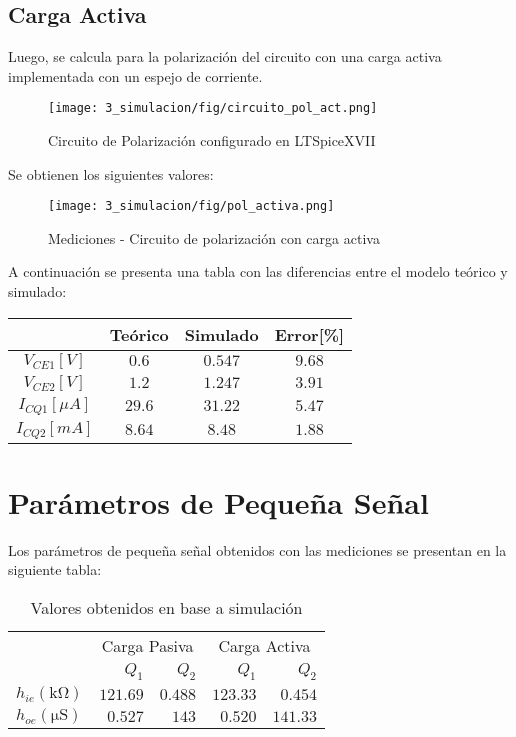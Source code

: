 \subsection{Carga Activa}

Luego, se calcula  para la polarización del circuito con una carga activa implementada con un espejo de corriente.

\begin{figure}[H]
    \centering
    \texttt{[image: 3\_simulacion/fig/circuito\_pol\_act.png]}
    \label{circuito_pol_activa}
    \caption{Circuito de Polarización configurado en LTSpiceXVII}
\end{figure}

Se obtienen los siguientes valores:

\begin{figure}[H]
    \centering
    \texttt{[image: 3\_simulacion/fig/pol\_activa.png]}
    \label{mediciones_pol_activa}
    \caption{Mediciones - Circuito de polarización con carga activa}
\end{figure}
A continuación se presenta una tabla con las diferencias entre el modelo teórico y simulado:

\begin{table}[H]
    \centering
    \begin{tabular}{|c|c|c|c|}
    \hline
                        & Teórico & Simulado & Error[\%] \\ \hline
    $V_{CE1}[V]$        & $0.6$   & $0.547$  & $9.68$    \\ \hline
    $V_{CE2}[V]$        & $1.2$   & $1.247$   & $3.91$   \\ \hline
    $I_{CQ1}[\mu A]$ & $29.6$  & $31.22$  & $5.47$   \\ \hline
    $I_{CQ2}[mA]$ & $8.64$  & $8.48$  & $1.88$   \\ \hline
    \end{tabular}
    \end{table}



\section{Parámetros de Pequeña Señal}
Los parámetros de pequeña señal obtenidos con las mediciones se presentan en la siguiente tabla:

\begin{table}[H]
    \centering
    \begin{tabular}{|l|r|r|r|r|}
        \hline
        \multirow{2}{*}{} & \multicolumn{2}{c|}{Carga Pasiva} & \multicolumn{2}{c|}{Carga Activa} \\ \cline{2-5} 
         & $Q_1$ & $Q_2$ & $Q_1$ & $Q_2$ \\ \hline
        $h_{ie} (\si{\kilo\ohm})$ & $121.69$ & $0.488$ & $123.33$ & $0.454$ \\
        $h_{oe} (\si{\micro\siemens})$ & $0.527$ & $143$ & $0.520$ & $141.33$ \\\hline
    \end{tabular}
    \caption{Valores  obtenidos en base a simulación}
    \label{tab:vals_teo}
\end{table}

